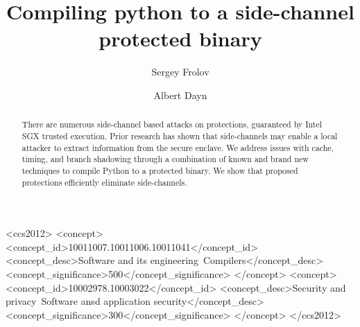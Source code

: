 \documentclass[sigplan, review]{acmart}
\begin{document}
\title{Compiling python to a side-channel protected binary}

\author{Sergey Frolov}

\author{Albert Dayn}



\begin{abstract}
There are numerous side-channel based attacks on protections, guaranteed by Intel SGX trusted execution. Prior research has shown that side-channels may enable a local attacker to extract information from the secure enclave. We address issues with cache, timing, and branch shadowing through a combination of known and brand new techniques to compile Python to a protected binary. We show that proposed protections efficiently eliminate side-channels.
\end{abstract}

%
%
\begin{CCSXML}
<ccs2012>
<concept>
<concept_id>10011007.10011006.10011041</concept_id>
<concept_desc>Software and its engineering~Compilers</concept_desc>
<concept_significance>500</concept_significance>
</concept>
<concept>
<concept_id>10002978.10003022</concept_id>
<concept_desc>Security and privacy~Software ansd application security</concept_desc>
<concept_significance>300</concept_significance>
</concept>
</ccs2012>
\end{CCSXML}




\maketitle
\end{document}
